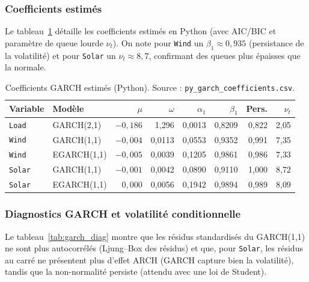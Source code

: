 \subsubsection{Coefficients estimés}
Le tableau~\ref{tab:garch_coef_py} détaille les coefficients estimés en
Python (avec AIC/BIC et paramètre de queue lourde \(\nu_t\)). On note pour
\texttt{Wind} un \(\beta_1 \approx 0{,}935\) (persistance de la volatilité) et
pour \texttt{Solar} un \(\nu_t \approx 8{,}7\), confirmant des queues plus
épaisses que la normale.

\begin{table}[H]
\centering
\caption{Coefficients GARCH estimés (Python).
Source : \texttt{py\_garch\_coefficients.csv}.}
\label{tab:garch_coef_py}
\small
\begin{tabular}{llrrrrrr}
\toprule
Variable & Modèle & $\mu$ & $\omega$ & $\alpha_1$ & $\beta_1$ & Pers. & $\nu_t$ \\
\midrule
\texttt{Load}  & GARCH(2,1)  & $-0{,}186$ & 1{,}296 & 0{,}0013 & 0{,}8209 & 0{,}822 & 2{,}05 \\
\texttt{Wind}  & GARCH(1,1)  & $-0{,}004$ & 0{,}0113 & 0{,}0553 & 0{,}9352 & 0{,}991 & 7{,}35 \\
\texttt{Wind}  & EGARCH(1,1) & $-0{,}005$ & 0{,}0039 & 0{,}1205 & 0{,}9861 & 0{,}986 & 7{,}33 \\
\texttt{Solar} & GARCH(1,1)  & $-0{,}001$ & 0{,}0042 & 0{,}0890 & 0{,}9110 & 1{,}000 & 8{,}72 \\
\texttt{Solar} & EGARCH(1,1) & $0{,}000$  & 0{,}0056 & 0{,}1942 & 0{,}9894 & 0{,}989 & 8{,}09 \\
\bottomrule
\end{tabular}
\end{table}

\subsubsection{Diagnostics GARCH et volatilité conditionnelle}
Le tableau~\ref{tab:garch_diag} montre que les résidus standardisés du
GARCH(1,1) ne sont plus autocorrélés (Ljung--Box des résidus) et que, pour
\texttt{Solar}, les résidus au carré ne présentent plus d'effet ARCH (GARCH
capture bien la volatilité), tandis que la non-normalité persiste (attendu avec
une loi de Student).

